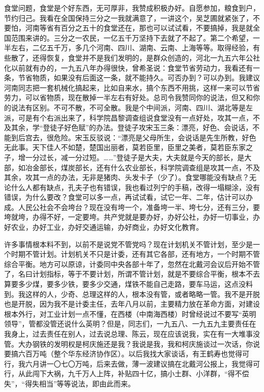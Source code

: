 食堂问题，食堂是个好东西，无可厚非，我赞成积极办好。自愿参加，粮食到户，节约归己。我看在全国保持三分之一我就满意了，一讲这个，吴芝圃就紧张了，不要怕，河南等省有百分之五十的食堂还在，那也可以试试看，不要搞掉，我是就全国范围来讲的。三分之一农民，一亿五千万坚持下去就了不起了。第二个希望，一半左右，二亿五千万，多几个河南、四川、湖南、云南、上海等等。取得经验，有些散了，还得恢复，食堂并不是我们发明的，是群众创造的，河北一九五六年公社化以前就有办的，一九五八年办得很快，曾希圣说：食堂节省劳动力，我看还有一条，节省物质，如果没有后面这一条，就不能持久。可否办到？可以办到。我建议河南同志把一套机械化搞起来，比如自来水，搞个东西不用挑，这样一来可以节省劳力，可以省物质，现在散掉一半左右有好处。总司令我赞同你的说法，但又和你的说法有区别。不可不散，不可全散。我是个中间派，河南、四川、湖北等是左派，可是有个右派出来了，科学院昌黎调查组说食堂没有一点好处，攻其一点，不及其余，学“登徒子好色赋”的办法。登徒子攻宋玉三条：漂亮，好色、会说话，不能到后宫去，很危险。宋玉反驳说：“漂亮是父母所生，会说话是先生所教，好色无此事。天下佳人不如楚，楚国出丽者，莫若臣里，臣里之美者，莫若臣东家之子，增一分过长，减一分过短。……”登徒子是大夫，大夫就是今天的部长，是大部，如冶金部长，煤炭部长，还有什么农业部长，科学院调查组是攻其一点，不及其余，攻其一点的办法，无非是猪肉、头发卡子（少了）。食堂哪能没有缺点？无论什么人都有缺点，孔夫子也有错误，我也看过列宁的手稿，改得一塌糊涂，没有错误，为什么要改？食堂可以多一点，再试试看，试它一年、二年，估计可以办成。人民公社会不会垮台？现在没有垮一个，准备垮一半、垮七分，还有三分，要垮就垮，办得不好，一定要垮。共产党就是要办好，办好公社，办好一切事业，办好农业，办好工业，办好交通运输，办好商业，办好文化教育。

许多事情根本料不到，以前不是说党不管党吗？现在计划机关不管计划，至少是一个时期不管计划。计划机关不只是计委，还有其它各部，还有地方，一个时期不管综合平衡。地方可以原谅，计委同中央各部十年了，忽然在北戴河会议后开始不管了，名曰计划指标，等于不要计划，所谓不管计划，就是不要综合平衡，根本不去算要多少煤，要多少铁，要多少交通，煤铁不能自己走路，要车马运，这点没料到。我这样的人，少奇、总理这样的人，根本没有管，或者略略一管。我不是开脱也是开脱，因为我不是计委主任，去年八月以前，主要精力放在革命方面，对建设根本外行，对工业计划一点不懂，在西楼（中南海西楼）时曾经说过不要写“英明领导”，管都没管还说什么英明？但是，同志们，一九五八、一九五九主要责任在我身上，过去责任在别人，过去说总理、陈云，现在应该说我，实在有一大堆事没管。大办钢铁的发明权是柯庆施还是我？我说是我，我和柯庆施谈过一次话，你说要搞六百万吨（整个华东经济协作区）。以后我找大家谈话，有王鹤寿也觉得可行，我六月讲一〇七〇万吨，后来去做，薄一波建议搞在北戴河公报上，我觉得可行，从此闯下大祸，九千万人上阵，补贴四十亿，搞小土群、小洋群，“得不偿失”，“得失相当”等等说法，即由此而来。

